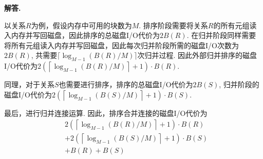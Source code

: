 \documentclass[12pt, oneside]{ctexart}
\numberwithin{figure}{section}
\numberwithin{table}{section}
\newenvironment{solution}{\par\noindent\textbf{解答. }}{\par}
\begin{document}
\begin{solution}
\begin{enumerate}[(1)]
\begin{itemize}
                    \qquad 以关系$R$为例，假设内存中可用的块数为$M$. 排序阶段需要将关系$R$的所有元组读入内存并写回磁盘，因此排序的总磁盘I/O代价为$2B(R)$. 在归并阶段同样需要将所有元组读入内存并写回磁盘，因此每次归并阶段所需的磁盘I/O次数为$2B(R)$, 共需要$\lceil\log_{M - 1}(B(R) / M)\rceil$次归并过程. 因此外部归并排序的磁盘I/O代价为$2\left(\left\lceil\log_{M - 1}(B(R) / M)\right\rceil + 1\right) \cdot B(R)$.
                    
                    \qquad 同理，对于关系$S$也需要进行排序，排序的总磁盘I/O代价为$2B(S)$, 归并阶段的磁盘I/O代价为$2\left(\left\lceil\log_{M - 1}(B(S) / M)\right\rceil + 1\right) \cdot B(S)$.

                    \qquad 最后，进行归并连接运算. 因此，排序合并连接的磁盘I/O代价为
                        \begin{equation*}
                            \begin{aligned}
                                & 2\left(\left\lceil\log_{M - 1}(B(R) / M)\right\rceil + 1\right) \cdot B(R) \\
                                & + 2\left(\left\lceil\log_{M - 1}(B(S) / M)\right\rceil + 1\right) \cdot B(S) \\
                                & + B(R) + B(S)
                            \end{aligned}
                        \end{equation*}
            \end{itemize}
    \end{enumerate}
\end{solution}
\end{document}
